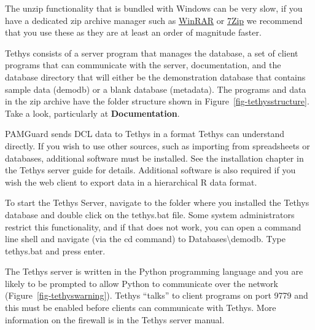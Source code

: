 \documentclass[
]{article}
\begin{document}
\begin{tcolorbox}[enhanced jigsaw, rightrule=.15mm, bottomtitle=1mm, left=2mm, breakable, opacitybacktitle=0.6, opacityback=0, bottomrule=.15mm, toprule=.15mm, colframe=quarto-callout-tip-color-frame, toptitle=1mm, colback=white, titlerule=0mm, title=\textcolor{quarto-callout-tip-color}{\faLightbulb}\hspace{0.5em}{Quicker unzipping}, coltitle=black, arc=.35mm, leftrule=.75mm, colbacktitle=quarto-callout-tip-color!10!white]

The unzip functionality that is bundled with Windows can be very slow,
if you have a dedicated zip archive manager such as
\href{https://www.win-rar.com}{WinRAR} or
\href{https://www.7-zip.org/}{7Zip} we recommend that you use these as
they are at least an order of magnitude faster.

\end{tcolorbox}

Tethys consists of a server program that manages the database, a set of
client programs that can communicate with the server, documentation, and
the database directory that will either be the demonstration database
that contains sample data (demodb) or a blank database (metadata). The
programs and data in the zip archive have the folder structure shown in
Figure~\ref{fig-tethysstructure}. Take a look, particularly at
\textbf{Documentation}.

PAMGuard sends DCL data to Tethys in a format Tethys can understand
directly. If you wish to use other sources, such as importing from
spreadsheets or databases, additional software must be installed. See
the installation chapter in the Tethys server guide for details.
Additional software is also required if you wish the web client to
export data in a hierarchical R data format.

To start the Tethys Server, navigate to the folder where you installed
the Tethys database and double click on the tethys.bat file. Some system
administrators restrict this functionality, and if that does not work,
you can open a command line shell and navigate (via the cd command) to
Databases\textbackslash demodb. Type tethys.bat and press enter.

The Tethys server is written in the Python programming language and you
are likely to be prompted to allow Python to communicate over the
network (Figure~\ref{fig-tethyswarning}). Tethys ``talks'' to client
programs on port 9779 and this must be enabled before clients can
communicate with Tethys. More information on the firewall is in the
Tethys server manual.
\end{document}
